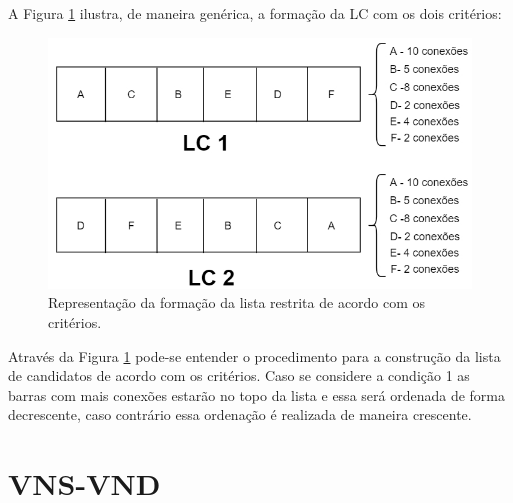 \documentclass[12pt]{article}
\begin{document}
A Figura \ref{fig9} ilustra, de maneira genérica, a formação da LC com os dois critérios:

\begin{figure}[H]
	\centering 
	\includegraphics[scale=0.6]{figuras/LC_construct.jpg}
	\caption{Representação da formação da lista restrita de acordo com os critérios.}
	\label{fig9} %
\end{figure}

Através da Figura \ref{fig9} pode-se entender o procedimento para a construção da lista de candidatos de acordo com os critérios. Caso se considere a condição 1 as barras com mais conexões estarão no topo da lista e essa será ordenada de forma decrescente, caso contrário essa ordenação é realizada de maneira crescente.

\section{VNS-VND}
\end{document}
